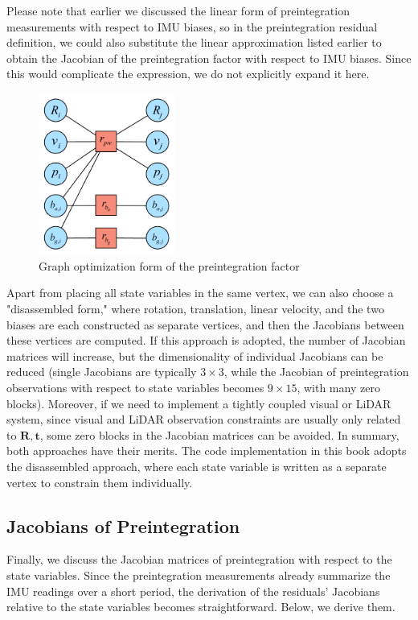 Please note that earlier we discussed the linear form of preintegration measurements with respect to IMU biases, so in the preintegration residual definition, we could also substitute the linear approximation listed earlier to obtain the Jacobian of the preintegration factor with respect to IMU biases. Since this would complicate the expression, we do not explicitly expand it here.

\begin{figure}[!htp]
	\centering
	\includegraphics[width=0.4\textwidth]{resources/preintegration/preintegration-residual-graph.pdf}
	\caption{Graph optimization form of the preintegration factor}
	\label{fig:preintegration-residual-graph}
\end{figure}

Apart from placing all state variables in the same vertex, we can also choose a "disassembled form," where rotation, translation, linear velocity, and the two biases are each constructed as separate vertices, and then the Jacobians between these vertices are computed. If this approach is adopted, the number of Jacobian matrices will increase, but the dimensionality of individual Jacobians can be reduced (single Jacobians are typically $3 \times 3$, while the Jacobian of preintegration observations with respect to state variables becomes $9 \times 15$, with many zero blocks). Moreover, if we need to implement a tightly coupled visual or LiDAR system, since visual and LiDAR observation constraints are usually only related to $\bm{R}, \bm{t}$, some zero blocks in the Jacobian matrices can be avoided. In summary, both approaches have their merits. The code implementation in this book adopts the disassembled approach, where each state variable is written as a separate vertex to constrain them individually.

\subsection{Jacobians of Preintegration}  
\label{sec:preinteg-jacobians}  
Finally, we discuss the Jacobian matrices of preintegration with respect to the state variables. Since the preintegration measurements already summarize the IMU readings over a short period, the derivation of the residuals' Jacobians relative to the state variables becomes straightforward. Below, we derive them.  

